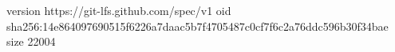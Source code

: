 version https://git-lfs.github.com/spec/v1
oid sha256:14e864097690515f6226a7daac5b7f4705487c0cf7f6c2a76ddc596b30f34bae
size 22004
